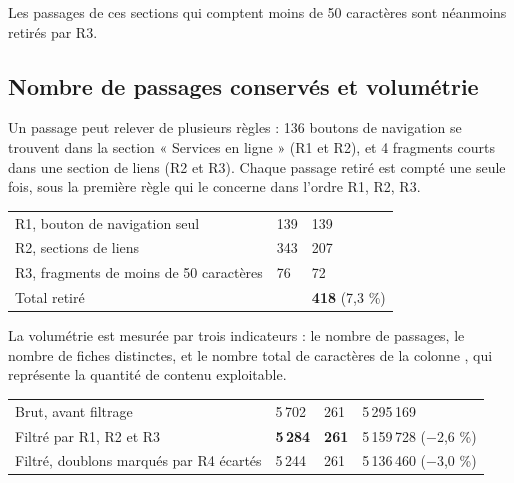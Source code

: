 Les passages de ces sections qui comptent moins de 50 caractères sont néanmoins retirés par R3.

\subsection{Nombre de passages conservés et volumétrie}

Un passage peut relever de plusieurs règles : 136 boutons de navigation se trouvent dans la section
« Services en ligne » (R1 et R2), et 4 fragments courts dans une section de liens (R2 et R3). Chaque
passage retiré est compté une seule fois, sous la première règle qui le concerne dans l'ordre R1, R2, R3.

\begin{tabletype}
\begin{tabularx}{\textwidth}{@{}Y L{2.6cm}L{2.9cm}@{}}
\toprule
{} &  &  \\
\midrule
R1, bouton de navigation seul & 139 & 139 \\
R2, sections de liens & 343 & 207 \\
R3, fragments de moins de 50 caractères & 76 & 72 \\
\midrule
Total retiré & & \textbf{418} (7,3 \%) \\
\bottomrule
\end{tabularx}
\end{tabletype}

La volumétrie est mesurée par trois indicateurs : le nombre de passages, le nombre de fiches
distinctes, et le nombre total de caractères de la colonne , qui représente la quantité de
contenu exploitable.

\begin{tabletype}
\begin{tabularx}{\textwidth}{@{}Y L{2cm}L{1.8cm}L{3.6cm}@{}}
\toprule
{} &  &  &  \\
\midrule
Brut, avant filtrage & 5\,702 & 261 & 5\,295\,169 \\
Filtré par R1, R2 et R3 & \textbf{5\,284} & \textbf{261} & 5\,159\,728 (−2,6 \%) \\
Filtré, doublons marqués par R4 écartés & 5\,244 & 261 & 5\,136\,460 (−3,0 \%) \\
\bottomrule
\end{tabularx}
\end{tabletype}


